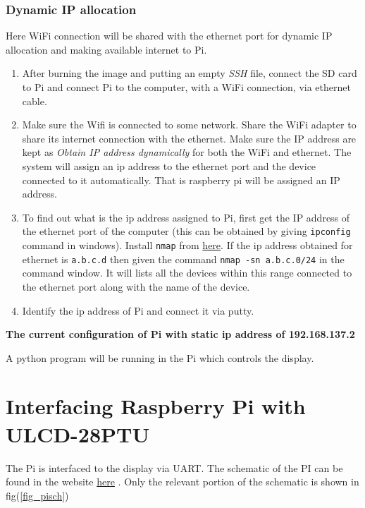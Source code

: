 \documentclass[12pt, a4paper, twoside]{article}
\begin{document}
\subsubsection{Dynamic IP allocation}
	Here WiFi connection will be shared with the ethernet port for dynamic IP allocation and making available internet to Pi.

	\begin{enumerate}
		\item After burning the image and putting an empty \textit{SSH} file, connect the SD card to Pi and connect Pi to the computer, with a WiFi connection, via ethernet cable.
		\item Make sure the Wifi is connected to some network. Share the WiFi adapter to share its internet connection with the ethernet. Make sure the IP address are kept as \textit {Obtain IP address dynamically} for both the WiFi and ethernet. The system will assign an ip address to the ethernet port and the device connected to it automatically. That is raspberry pi will be assigned an IP address.
		\item To find out what is the ip address assigned to Pi, first get the IP address of the ethernet port of the computer (this can be obtained by giving \texttt{ipconfig} command in windows). Install \texttt{nmap} from \href{https://nmap.org/download.html}{here}. If the ip address obtained for ethernet is \texttt{a.b.c.d} then given the command \texttt{nmap -sn a.b.c.0/24} in the command window. It will lists all the devices within this range connected to the ethernet port along with the name of the device.
		\item Identify the ip address of Pi and connect it via putty.
	\end{enumerate}

\textbf{The current configuration of Pi with static ip address of 192.168.137.2}

A python program will be running in the Pi which controls the display.

\section{Interfacing Raspberry Pi with ULCD-28PTU}

	The Pi is interfaced to the display via UART. The schematic of the PI can be found in the website \href{https://www.raspberrypi.org/documentation/hardware/raspberrypi/schematics/Raspberry-Pi-2B-V1.2-Schematics.pdf}{here} \cite{bib_pisch}. Only the relevant portion of the schematic is shown in fig(\ref{fig_pisch})
\end{document}
